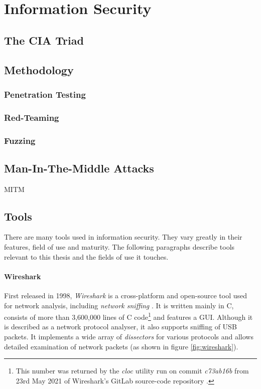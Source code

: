 \section{Information Security}
\label{sec:information-security}
\subsection{The CIA Triad}

\subsection{Methodology}
\subsubsection{Penetration Testing}
\subsubsection{Red-Teaming}
\subsubsection{Fuzzing}

\subsection{Man-In-The-Middle Attacks}
\ac{MITM}

\subsection{Tools}
There are many tools used in information security. They vary greatly in their features, field of use and maturity. The following paragraphs describe tools relevant to this thesis and the fields of use it touches.

\paragraph{Wireshark} First released in 1998, \emph{Wireshark} is a cross-platform and open-source tool used for network analysis, including \emph{network sniffing} \cite{wireshark}. It is written mainly in C, consists of more than 3,600,000 lines of C code\footnote{This number was returned by the \emph{cloc} utility run on commit \emph{c73ab16b} from 23rd May 2021 of Wireshark's GitLab source-code repository \cite{wiresharkgit}.} and features a \ac{GUI}. Although it is described as a network protocol analyser, it also supports sniffing of \ac{USB} packets. It implements a wide array of \emph{dissectors} for various protocols and allows detailed examination of network packets (as shown in figure \ref{fig:wireshark}).

